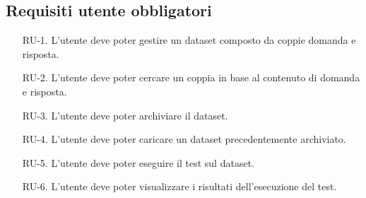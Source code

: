 \subsection{Requisiti utente obbligatori}
\begin{enumerate}
    \label{item:RU-1}
    \item[RU-1.] L'utente deve poter gestire un dataset composto da coppie domanda e risposta.
    
    \label{item:RU-2}
    \item[RU-2.] L'utente deve poter cercare un coppia in base al contenuto di domanda e risposta.
    
    \label{item:RU-3}
    \item[RU-3.] L'utente deve poter archiviare il dataset.
    
    \label{item:RU-4}
    \item[RU-4.] L'utente deve poter caricare un dataset precedentemente archiviato.
    
    \label{item:RU-5}
    \item[RU-5.] L'utente deve poter eseguire il test sul dataset.
    
    \label{item:RU-6}
    \item[RU-6.] L'utente deve poter visualizzare i risultati dell’esecuzione del test.
\end{enumerate}